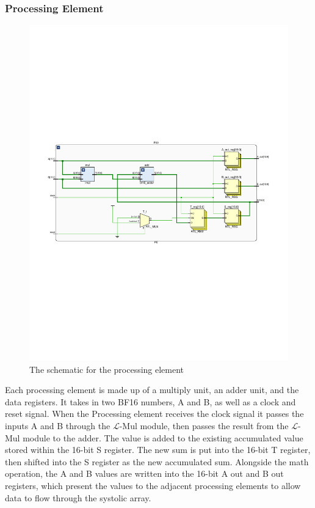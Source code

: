 \documentclass[12pt,letterpaper]{article}
\newcommand{\lmul}{$\mathcal{L}$-Mul\xspace}
\begin{document}
\subsubsection*{Processing Element}

\begin{figure}[h]
    \centering
    \includegraphics[clip, trim=0.5cm 9cm 0.5cm 9cm, width=1.00\textwidth]{Verilog Schematics/PE.pdf}
    \caption{The schematic for the processing element}
    \label{fig:adder}
\end{figure}

Each processing element is made up of a multiply unit, an adder unit, and the data registers.  It takes in two BF16 numbers, A and B, as well as a clock and reset signal.  When the Processing element receives the clock signal it passes the inputs A and B through the \lmul module, then passes the result from the \lmul module to the adder.  The value is added to the existing accumulated value stored within the 16-bit S register.  The new sum is put into the 16-bit T register, then shifted into the S register as the new accumulated sum.  Alongside the math operation, the A and B values are written into the 16-bit A out and B out registers, which present the values to the adjacent processing elements to allow data to flow through the systolic array.  
\end{document}
